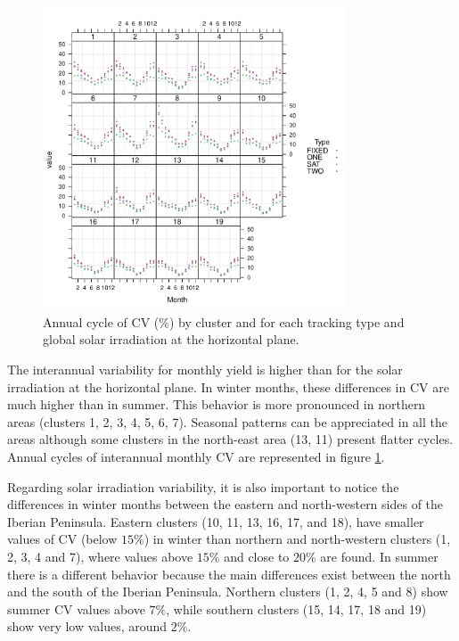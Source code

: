 \begin{figure}
\includegraphics[width=0.8\textwidth]{figs/capitulo5/ciclo_anual_byCluster_all2}
\caption[Annual cycle of CV by cluster and tracking type over the Iberian Peninsula]{Annual cycle of CV ($\%$) by cluster and for each tracking type and global solar irradiation at the horizontal plane.}
\label{cicloAnualCV_all}
\end{figure}

The interannual variability for monthly yield is higher than for the solar irradiation at the horizontal plane. In winter months, these differences in CV are much higher than in summer. This behavior is more pronounced in northern areas (clusters 1, 2, 3, 4, 5, 6, 7).  Seasonal patterns can be appreciated in all the areas although some clusters in the north-east area (13, 11) present flatter cycles. Annual cycles of interannual monthly CV are represented in figure \ref{cicloAnualCV_all}.

Regarding solar irradiation variability, it is also important to notice the differences in winter months between the eastern and north-western sides of the Iberian Peninsula. Eastern clusters (10, 11, 13, 16, 17, and 18), have smaller values of CV (below $15\%$) in winter than northern and north-western clusters (1, 2, 3, 4 and 7), where values above $15\%$ and close to $20\%$ are found. In summer there is a different behavior because the main differences exist between the north and the south of the Iberian Peninsula. Northern clusters (1, 2, 4, 5 and 8) show summer CV values above $7\%$, while southern clusters (15, 14, 17, 18 and 19) show very low values, around $2\%$.

